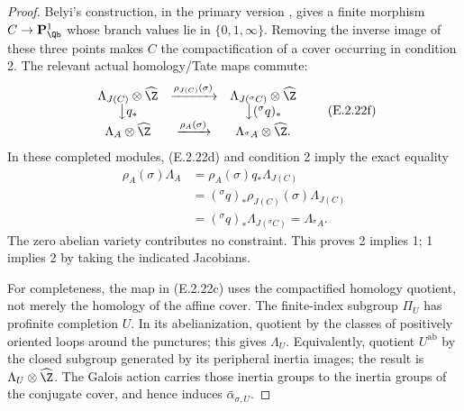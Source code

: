 \begin{proof}
Belyi's construction, in the primary version
\cite[Theorem 1 and old proof, pp.1--2]{GenBelyi1997}, gives a
finite morphism \(C\to\mathbf P^1_{\Qb}\) whose branch
values lie in \(\{0,1,\infty\}\). Removing the inverse image
of these three points makes \(C\) the compactification of a
cover occurring in condition 2.
The relevant actual homology/Tate maps commute:
\[
\begin{array}{ccc}
 \Lambda_{J(C)}\otimes\widehat\Z
   &\xrightarrow{\rho_{J(C)}(\sigma)}&
 \Lambda_{J({}^{\sigma}C)}\otimes\widehat\Z\\
 \big\downarrow q_* && \big\downarrow({}^{\sigma}q)_*\\
 \Lambda_A\otimes\widehat\Z
   &\xrightarrow{\rho_A(\sigma)}&
 \Lambda_{{}^{\sigma}A}\otimes\widehat\Z.
\end{array}
 \tag{E.2.22f}
\]
In these completed modules, (E.2.22d) and condition 2 imply
the exact equality
\[
\begin{split}
 \rho_A(\sigma)\Lambda_A
  &=\rho_A(\sigma)q_*\Lambda_{J(C)}\\
  &=({}^{\sigma}q)_*\rho_{J(C)}(\sigma)\Lambda_{J(C)}\\
  &=({}^{\sigma}q)_*\Lambda_{J({}^{\sigma}C)}
    =\Lambda_{{}^{\sigma}A}.
\end{split}
 \tag{E.2.22g}
\]
The zero abelian variety contributes no constraint.
This proves 2 implies 1; 1 implies 2 by taking the indicated
Jacobians.

For completeness, the map in (E.2.22c) uses the compactified
homology quotient, not merely the homology of the affine
cover. The finite-index subgroup \(\Pi_U\) has profinite
completion \(U\). In its abelianization, quotient by the
classes of positively oriented loops around the punctures;
this gives \(\Lambda_U\). Equivalently, quotient
\(U^{\mathrm{ab}}\) by the closed subgroup generated by its
peripheral inertia images; the result is
\(\Lambda_U\otimes\widehat\Z\).
The Galois action carries those inertia groups to the inertia
groups of the conjugate cover, and hence induces
\(\bar\alpha_{\sigma,U}\).


\end{proof}
